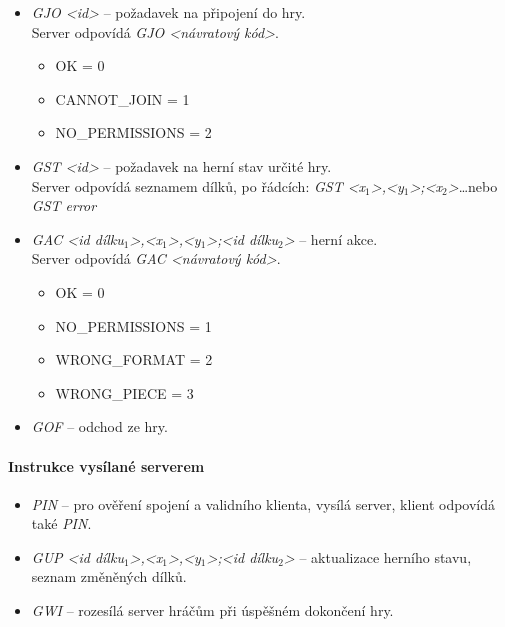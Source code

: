 \documentclass[12pt, a4paper]{report}
\begin{document}
\begin{itemize}
	\item \emph{GJO {\textless}id{\textgreater}} -- požadavek na připojení do hry.\\
	Server odpovídá \emph{GJO {\textless}návratový kód{\textgreater}}.
	\begin{itemize}
		\item OK = 0
		\item CANNOT\_JOIN = 1
		\item NO\_PERMISSIONS = 2
	\end{itemize}
	\item \emph{GST {\textless}id{\textgreater}} -- požadavek na herní stav určité hry.\\
	Server odpovídá seznamem dílků, po řádcích: \emph{GST {\textless}x${}_1${\textgreater},{\textless}y${}_1${\textgreater};{\textless}x${}_2${\textgreater}}\dots nebo \emph{GST error}
	\item \emph{GAC {\textless}id dílku${}_1${\textgreater},{\textless}x${}_1${\textgreater},{\textless}y${}_1${\textgreater};{\textless}id dílku${}_2${\textgreater}} -- herní akce.\\
	Server odpovídá \emph{GAC {\textless}návratový kód{\textgreater}}.
	\begin{itemize}
		\item OK = 0
		\item NO\_PERMISSIONS = 1
		\item WRONG\_FORMAT = 2
		\item WRONG\_PIECE = 3
	\end{itemize}
	\item \emph{GOF} -- odchod ze hry.
\end{itemize}

\paragraph{Instrukce vysílané serverem}
\begin{itemize}
	\item \emph{PIN} -- pro ověření spojení a validního klienta, vysílá server, klient odpovídá také \emph{PIN}.
	\item \emph{GUP {\textless}id dílku${}_1${\textgreater},{\textless}x${}_1${\textgreater},{\textless}y${}_1${\textgreater};{\textless}id dílku${}_2${\textgreater}} -- aktualizace herního stavu, seznam změněných dílků.
	\item \emph{GWI} -- rozesílá server hráčům při úspěšném dokončení hry.
\end{itemize}
\end{document}
